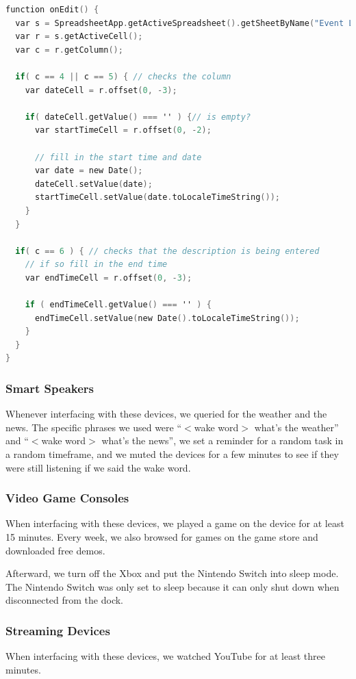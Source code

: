 \noindent
\begin{minipage}{\textwidth}
\begin{lstlisting}[basicstyle=\linespread{0.95}\ttfamily, language=C,label={lst:sheetScript},caption={Open and Read from a Socket}]
function onEdit() {
  var s = SpreadsheetApp.getActiveSpreadsheet().getSheetByName("Event Log");
  var r = s.getActiveCell();
  var c = r.getColumn();

  if( c == 4 || c == 5) { // checks the column
    var dateCell = r.offset(0, -3);

    if( dateCell.getValue() === '' ) {// is empty?
      var startTimeCell = r.offset(0, -2);

      // fill in the start time and date
      var date = new Date();
      dateCell.setValue(date);
      startTimeCell.setValue(date.toLocaleTimeString());
    }
  }

  if( c == 6 ) { // checks that the description is being entered
    // if so fill in the end time
    var endTimeCell = r.offset(0, -3);

    if ( endTimeCell.getValue() === '' ) {
      endTimeCell.setValue(new Date().toLocaleTimeString());
    }
  }
}
\end{lstlisting}
\end{minipage}

\subsubsection{Smart Speakers}
Whenever interfacing with these devices, we queried for the weather and the news. The specific phrases we used were ``$<$wake word$>$ what's the weather'' and ``$<$wake word$>$ what's the news'', we  set a reminder for a random task in a random timeframe, and we muted the devices for a few minutes to see if they were still listening if we said the wake word.

\subsubsection{Video Game Consoles}
When interfacing with these devices, we played a game on the device for at least 15 minutes. Every week, we also browsed for games on the game store and downloaded free demos.

Afterward, we turn off the Xbox and put the Nintendo Switch into sleep mode. The Nintendo Switch was only set to sleep because it can only shut down when disconnected from the dock.

\subsubsection{Streaming Devices}
When interfacing with these devices, we watched YouTube for at least three minutes.

